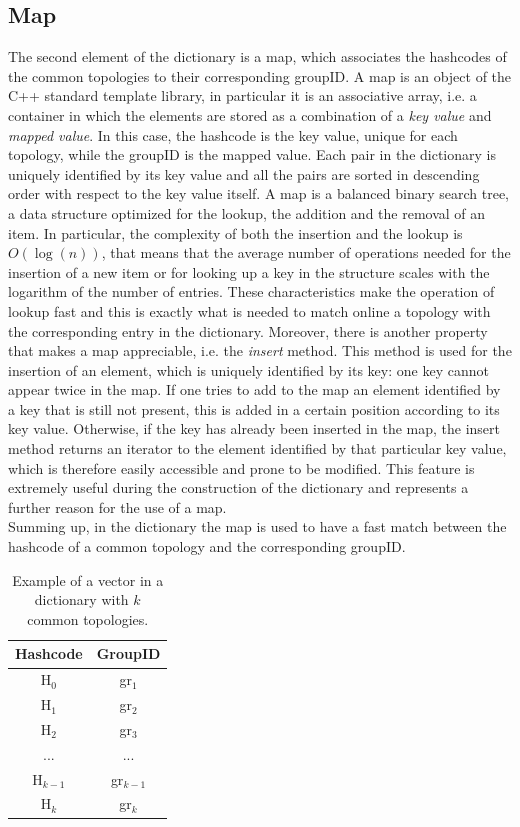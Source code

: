\subsection{Map}
\label{sec:map}
The second element of the dictionary is a map, which associates the hashcodes of the common topologies to their corresponding groupID. A map is an object of the C++ standard template library, in particular it is an associative array, i.e. a container in which the elements are stored as a combination of a \textit{key value} and \textit{mapped value}\cite{map}. In this case, the hashcode is the key value, unique for each topology, while the groupID is the mapped value. Each pair in the dictionary is uniquely identified by its key value and all the pairs are sorted in descending order with respect to the key value itself. A map is a balanced binary search tree, a data structure optimized for the lookup, the addition and the removal of an item. In particular, the complexity of both the insertion and the lookup is $O(\log(n))$, that means that the average number of operations needed for the insertion of a new item or for looking up a key in the structure scales with the logarithm of the number of entries. These characteristics make the operation of lookup fast and this is exactly what is needed to match online a topology with the corresponding entry in the dictionary. Moreover, there is another property that makes a map appreciable, i.e. the \textit{insert} method. This method is used for the insertion of an element, which is uniquely identified by its key: one key cannot appear twice in the map. If one tries to add to the map an element identified by a key that is still not present, this is added in a certain position according to its key value. Otherwise, if the key has already been inserted in the map, the insert method returns an iterator to the element identified by that particular key value, which is therefore easily accessible and prone to be modified. This feature is extremely useful during the construction of the dictionary and represents a further reason for the use of a map.\\
Summing up, in the dictionary the map is used to have a fast match between the hashcode of a common topology and the corresponding groupID.
%
\begin{table}
\centering
\renewcommand\arraystretch{1.5}
 \begin{tabular}{|c|c|}
  \hline
  Hashcode & GroupID\\
  \hline
  H$_0$ & gr$_1$\\
  H$_1$ & gr$_2$\\
  H$_2$ & gr$_3$\\
  ... & ...\\
  H$_{k-1}$ & gr$_{k-1}$\\
  H$_k$ & gr$_{k}$\\
  \hline
 \end{tabular}
 \caption{Example of a vector in a dictionary with $k$ common topologies.}
 \label{tab:map}
\end{table}
%
